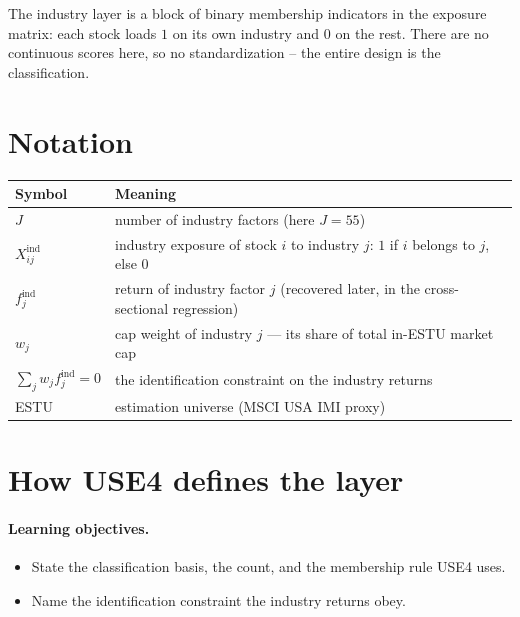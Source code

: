 \documentclass[11pt]{article}
\theoremstyle{definition}
\theoremstyle{plain}
\theoremstyle{remark}
\begin{document}
\begin{keyresult}
The industry layer is a block of binary membership indicators in the exposure matrix: each stock loads $1$ on its own industry and $0$ on the rest. There are no continuous scores here, so no standardization -- the entire design is the classification.
\end{keyresult}

\section*{Notation}

\begin{center}
\begin{tabular}{@{}ll@{}}
\toprule
Symbol & Meaning \\
\midrule
$J$ & number of industry factors (here $J=55$) \\
$X^{\text{ind}}_{ij}$ & industry exposure of stock $i$ to industry $j$: $1$ if $i$ belongs to $j$, else $0$ \\
$f^{\text{ind}}_j$ & return of industry factor $j$ (recovered later, in the cross-sectional regression) \\
$w_j$ & cap weight of industry $j$ --- its share of total in-ESTU market cap \\
$\sum_j w_j f^{\text{ind}}_j = 0$ & the identification constraint on the industry returns \\
ESTU & estimation universe (MSCI USA IMI proxy) \\
\bottomrule
\end{tabular}
\end{center}

\section{How USE4 defines the layer}\label{sec:def}

\paragraph{Learning objectives.}
\begin{itemize}[leftmargin=1.4em,topsep=2pt]
  \item State the classification basis, the count, and the membership rule USE4 uses.
  \item Name the identification constraint the industry returns obey.
\end{itemize}
\end{document}
